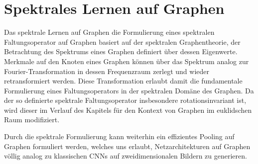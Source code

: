 \chapter{Spektrales Lernen auf Graphen}
\label{spektrales_lernen}

Das spektrale Lernen auf Graphen \bzw{} die Formulierung eines spektralen Faltungsoperator auf Graphen basiert auf der spektralen Graphentheorie, \dhe{} der Betrachtung des Spektrums eines Graphen definiert über dessen Eigenwerte.
Merkmale auf den Knoten eines Graphen können über das Spektrum analog zur Fourier-Transformation in dessen Frequenzraum zerlegt und wieder retransformiert werden.
Diese Transformation erlaubt damit die fundamentale Formulierung eines Faltungsoperators in der spektralen Domäne des Graphen.
Da der so definierte spektrale Faltungsoperator insbesondere rotationsinvariant ist, wird dieser im Verlauf des Kapitels für den Kontext von Graphen im euklidschen Raum modifiziert.

Durch die spektrale Formulierung kann weiterhin ein effizientes Pooling auf Graphen formuliert werden, welches uns erlaubt, Netzarchitekturen auf Graphen völlig analog zu klassischen \glspl{CNN} auf zweidimensionalen Bildern zu generieren.






